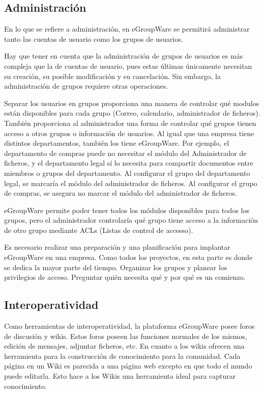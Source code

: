 \subsection{Administración}

En lo que se refiere a administración, en eGroupWare se permitirá administrar tanto las cuentas de usuario como los grupos de usuarios.

Hay que tener en cuenta que la administración de grupos de usuarios es más compleja que la de cuentas de usuario, pues estas últimas únicamente necesitan su creación, su posible modificación y su cancelación. Sin embargo, la administración de grupos requiere otras operaciones.

Separar los usuarios en grupos proporciona una manera de controlar qué modulos están disponibles para cada grupo (Correo, calendario, administrador de ficheros). También proporciona al administrador una forma de controlar qué grupos tienen acceso a otros grupos o información de usuarios. Al igual que una empresa tiene distintos departamentos, también los tiene eGroupWare. Por ejemplo, el departamento de compras puede no necesitar el módulo del Administrador de ficheros, y el departamento legal sí lo necesita para compartir documentos entre miembros o grupos del departamento. Al configurar el grupo del departamento legal, se marcaría el módulo del administrador de ficheros. Al configurar el grupo de compras, se asegura no marcar el módulo del administrador de ficheros.

eGroupWare permite poder tener todos los módulos disponibles para todos los grupos, pero el administrador controlaría qué grupo tiene acceso a la información de otro grupo mediante ACLs (Listas de control de accesso).

Es necesario realizar una preparación y una planificación para implantar eGroupWare en una empresa. Como todos los proyectos, en esta parte es donde se dedica la mayor parte del tiempo. Organizar los grupos y planear los privilegios de acceso. Preguntar quién necesita qué y por qué es un comienzo.

\subsection{Interoperatividad}

Como herramientas de interoperatividad, la plataforma eGroupWare posee foros de discusión y wikis. Estos foros poseen las funciones normales de los mismos, edición de mensajes, adjuntar ficheros, etc. En cuanto a los wikis ofrecen una herramienta para la construcción de conocimiento para la comunidad. Cada página en un Wiki es parecida a una página web excepto en que todo el mundo puede editarla. Esto hace a los Wikis una herramienta ideal para capturar conocimiento.

